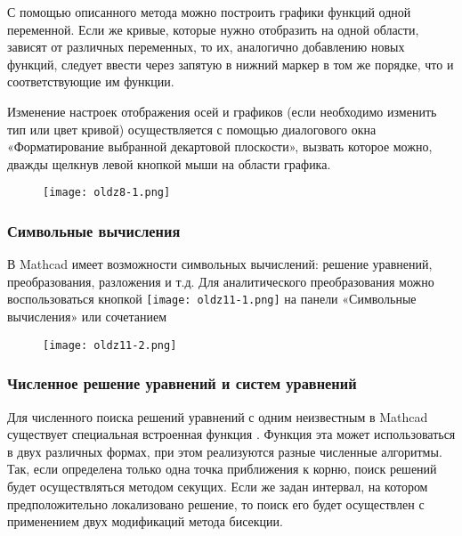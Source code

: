 С помощью описанного метода можно построить графики функций одной переменной. Если же кривые, которые нужно отобразить на одной области, зависят от различных переменных, то их, аналогично добавлению новых функций, следует ввести через запятую в нижний маркер в том же порядке, что и соответствующие им функции.

Изменение настроек отображения осей и графиков (если необходимо изменить тип или цвет кривой) осуществляется с помощью диалогового окна «Форматирование выбранной декартовой плоскости», вызвать которое можно, дважды щелкнув левой кнопкой мыши на области графика.

\begin{figure}[h]
	\begin{center}
		\texttt{[image: oldz8-1.png]}
	\end{center}
\end{figure}

\subsubsection*{Символьные вычисления}
В Mathcad имеет возможности символьных вычислений: решение уравнений, преобразования, разложения и т.д. Для аналитического преобразования можно воспользоваться кнопкой \texttt{[image: oldz11-1.png]} на панели «Символьные вычисления» или сочетанием 
\begin{figure}[h]
	\begin{center}
		\texttt{[image: oldz11-2.png]}
	\end{center}
\end{figure}

\subsubsection*{Численное решение уравнений и систем уравнений}
Для численного поиска решений уравнений с одним неизвестным в Mathcad существует специальная встроенная функция . Функция эта может использоваться в двух различных формах, при этом реализуются разные численные алгоритмы. Так, если определена только одна точка приближения к корню, поиск решений будет осуществляться методом секущих. Если же задан интервал, на котором предположительно локализовано решение, то поиск его будет осуществлен с применением двух модификаций метода бисекции.


